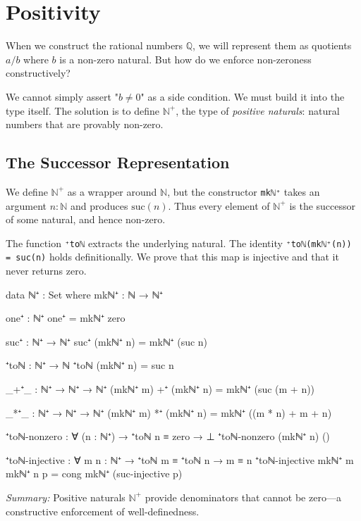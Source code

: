 \documentclass[11pt,a4paper]{book}
\begin{document}
\chapter{Positivity}

When we construct the rational numbers $\mathbb{Q}$, we will represent them as 
quotients $a/b$ where $b$ is a non-zero natural. But how do we enforce non-zeroness 
constructively?

We cannot simply assert "$b \ne 0$" as a side condition. We must build it into the 
type itself. The solution is to define $\mathbb{N}^+$, the type of \emph{positive naturals}: 
natural numbers that are provably non-zero.

\section{The Successor Representation}

We define $\mathbb{N}^+$ as a wrapper around $\mathbb{N}$, but the constructor \texttt{mkℕ⁺} 
takes an argument $n : \mathbb{N}$ and produces $\mathrm{suc}(n)$. Thus every element 
of $\mathbb{N}^+$ is the successor of some natural, and hence non-zero.

The function \texttt{⁺toℕ} extracts the underlying natural. The identity \texttt{⁺toℕ(mkℕ⁺(n)) = suc(n)} 
holds definitionally. We prove that this map is injective and that it never returns zero.

\begin{code}
data ℕ⁺ : Set where
  mkℕ⁺ : ℕ → ℕ⁺

one⁺ : ℕ⁺
one⁺ = mkℕ⁺ zero

suc⁺ : ℕ⁺ → ℕ⁺
suc⁺ (mkℕ⁺ n) = mkℕ⁺ (suc n)

⁺toℕ : ℕ⁺ → ℕ
⁺toℕ (mkℕ⁺ n) = suc n

_+⁺_ : ℕ⁺ → ℕ⁺ → ℕ⁺
(mkℕ⁺ m) +⁺ (mkℕ⁺ n) = mkℕ⁺ (suc (m + n))

_*⁺_ : ℕ⁺ → ℕ⁺ → ℕ⁺
(mkℕ⁺ m) *⁺ (mkℕ⁺ n) = mkℕ⁺ ((m * n) + m + n)
\end{code}
\begin{code}
⁺toℕ-nonzero : ∀ (n : ℕ⁺) → ⁺toℕ n ≡ zero → ⊥
⁺toℕ-nonzero (mkℕ⁺ n) ()

⁺toℕ-injective : ∀ {m n : ℕ⁺} → ⁺toℕ m ≡ ⁺toℕ n → m ≡ n
⁺toℕ-injective {mkℕ⁺ m} {mkℕ⁺ n} p = cong mkℕ⁺ (suc-injective p)
\end{code}

\medskip
\noindent\textit{Summary:} Positive naturals $\mathbb{N}^+$ provide denominators that cannot be zero—a constructive enforcement of well-definedness.
\end{document}
